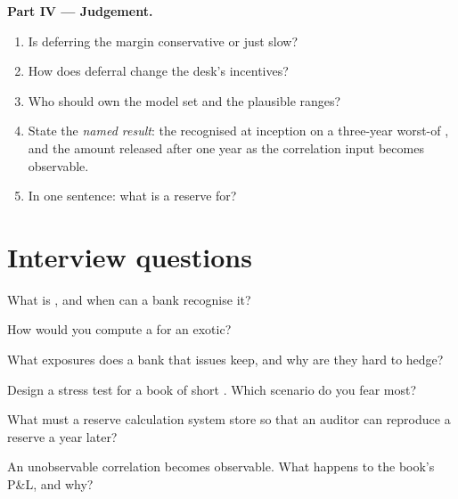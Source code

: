 \begin{problem}
\medskip\noindent\textbf{Part IV --- Judgement.}
\begin{enumerate}[resume]
\item Is deferring the margin conservative or just slow?
\item How does deferral change the desk's incentives?
\item Who should own the model set and the plausible ranges?
\item State the \emph{named result}: the  recognised at inception on a three-year worst-of , and the amount released after one year as the
correlation input becomes observable.
\item In one sentence: what is a reserve for?
\end{enumerate}
\end{problem}

\section{Interview questions}

\begin{interviewq}\label{iq:dv:managing-an-exotic-book:1}
What is , and when can a bank recognise it?
\end{interviewq}

\begin{interviewq}\label{iq:dv:managing-an-exotic-book:2}
How would you compute a  for an exotic?
\end{interviewq}

\begin{interviewq}\label{iq:dv:managing-an-exotic-book:3}
What exposures does a bank that issues  keep, and why are they hard to hedge?
\end{interviewq}

\begin{interviewq}\label{iq:dv:managing-an-exotic-book:4}
Design a stress test for a book of short . Which scenario do you fear most?
\end{interviewq}

\begin{interviewq}\label{iq:dv:managing-an-exotic-book:5}
What must a reserve calculation system store so that an auditor can reproduce a reserve a year later?
\end{interviewq}

\begin{interviewq}\label{iq:dv:managing-an-exotic-book:6}
An unobservable correlation becomes observable. What happens to the book's P\&L, and why?
\end{interviewq}
